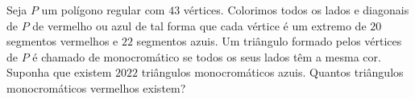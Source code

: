 Seja \(P\) um polígono regular com \(43\) vértices. Colorimos todos os lados e diagonais de \(P\) de vermelho ou azul de tal forma que cada vértice é um extremo de \(20\) segmentos vermelhos e \(22\) segmentos azuis. Um triângulo formado pelos vértices de \(P\) é chamado de monocromático se todos os seus lados têm a mesma cor. Suponha que existem \(2022\) triângulos monocromáticos azuis. Quantos triângulos monocromáticos vermelhos existem?
